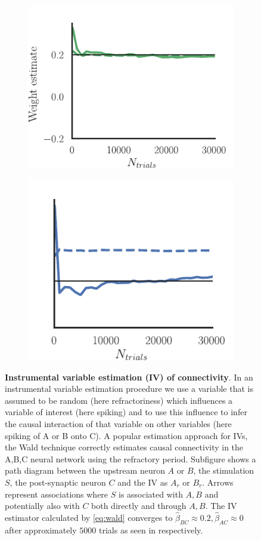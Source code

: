 \documentclass[11pt]{article}
\begin{document}
\begin{figure}
\begin{subfigure}{0.485\textwidth} 
\includegraphics[scale=1]{wald_BC}
\caption{} \label{fig:cchvswald:1}
\end{subfigure}\hfill
\begin{subfigure}{0.485\textwidth} 
\includegraphics[scale=1]{wald_AC}
\caption{} \label{fig:cchvswald:2}
\end{subfigure}
\caption{{\bf Instrumental variable estimation (IV) of connectivity}.  In an instrumental variable estimation procedure we use a variable that is assumed to be random (here refractoriness) which influences a variable of interest (here spiking) and to use this influence to infer the causal interaction of that variable on other variables (here spiking of A or B onto C).  A popular estimation approach for IVs,  the Wald technique correctly estimates causal connectivity in the A,B,C neural network using the refractory period. Subfigure  shows a path diagram \citep{wright1921correlation} between the upstream neuron $ A $ or $ B $, the stimulation $ S $, the post-synaptic neuron $ C $ and the IV as $ A_{r} $ or $ B_{r} $. Arrows represent associations where $ S $ is associated with $ A,B $ and potentially also with $ C $ both directly and through $ A,B $. The IV estimator calculated by \cref{eq:wald} converges to $ \hat{\beta}_{BC} \approx 0.2, \hat{\beta}_{AC} \approx 0 $ after approximately $ 5000 $ trials as seen in  respectively. %
}
\end{figure}
\end{document}
